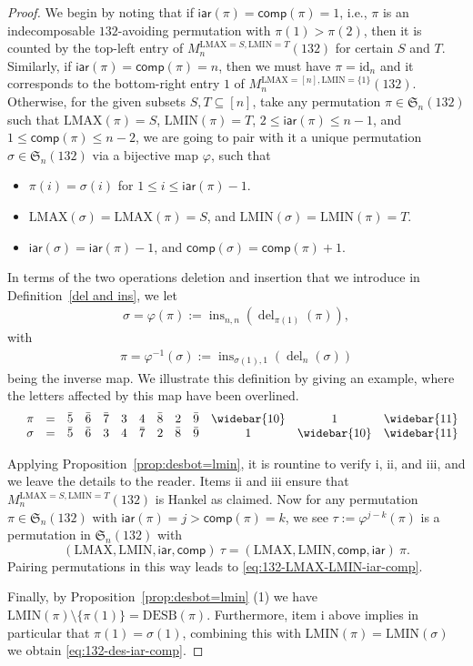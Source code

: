 \documentclass[12pt]{amsart}
\numberwithin{equation}{section}
\theoremstyle{plain}
\theoremstyle{definition}
\def\S{\mathfrak{S}}
\def\iar{\mathsf{iar}}
\def\comp{\mathsf{comp}}
\def\LMAX{\mathrm{LMAX}}
\def\LMIN{\mathrm{LMIN}}
\def\del{\operatorname{del}}
\def\ins{\operatorname{ins}}
\def\DESB{\mathrm{DESB}}
\def\id{\mathrm{id}}
\def\DESB{\mathrm{DESB}}
\begin{document}
\begin{proof}
We begin by noting that if $\iar(\pi)=\comp(\pi)=1$, i.e., $\pi$ is an indecomposable $132$-avoiding permutation with $\pi(1)>\pi(2)$, then it is counted by the top-left entry of $M_n^{\LMAX=S,\LMIN=T}(132)$ for certain $S$ and $T$. Similarly, if $\iar(\pi)=\comp(\pi)=n$, then we must have $\pi=\id_n$ and it corresponds to the bottom-right entry $1$ of $M_n^{\LMAX=[n],\LMIN=\{1\}}(132)$. Otherwise, for the given subsets $S,T\subseteq [n]$, take any permutation $\pi\in\S_n(132)$ such that $\LMAX(\pi)=S$, $\LMIN(\pi)=T$, $2\le \iar(\pi)\le n-1$, and $1\le \comp(\pi)\le n-2$, we are going to pair with it a unique permutation $\sigma\in\S_n(132)$ via a bijective map $\varphi$, such that
\begin{itemize}
	\item[i.] $\pi(i)=\sigma(i)$ for $1\le i\le \iar(\pi)-1$.
	\item[ii.] $\LMAX(\sigma)=\LMAX(\pi)=S$, and $\LMIN(\sigma)=\LMIN(\pi)=T$.
	\item[iii.] $\iar(\sigma)=\iar(\pi)-1$, and $\comp(\sigma)=\comp(\pi)+1$.
\end{itemize} 
In terms of the two operations deletion and insertion that we introduce in Definition~\ref{del and ins}, we let
\begin{align*}
\sigma=\varphi(\pi):=\ins_{n,n}(\del_{\pi(1)}(\pi)),
\end{align*}
with
\begin{align*}
\pi=\varphi^{-1}(\sigma):=\ins_{\sigma(1),1}(\del_{n}(\sigma))
\end{align*}
being the inverse map. We illustrate this definition by giving an example, where the letters affected by this map have been overlined.
\medskip
$$
\begin{array}{c c c  c c c c c c c c c c c}
	&\pi &=&\bar5&\bar6&\bar7&3&4&\bar8&2&\bar9&\widebar{10}&1&\widebar{11}\\
	&\sigma &=&\bar5&\bar6&3&4&\bar7&2&\bar8&\bar9&1&\widebar{10}&\widebar{11}
\end{array}
$$

Applying Proposition~\ref{prop:desbot=lmin}, it is rountine to verify i, ii, and iii, and we leave the details to the reader. Items ii and iii ensure that $M_n^{\LMAX=S,\LMIN=T}(132)$ is Hankel as claimed. Now for any permutation $\pi\in\S_n(132)$ with $\iar(\pi)=j>\comp(\pi)=k$, we see $\tau:=\varphi^{j-k}(\pi)$ is a permutation in $\S_n(132)$ with
$$(\LMAX,\LMIN,\iar,\comp)~\tau=(\LMAX,\LMIN,\comp,\iar)~\pi.$$
Pairing permutations in this way leads to \eqref{eq:132-LMAX-LMIN-iar-comp}.

Finally, by Proposition~\ref{prop:desbot=lmin} (1) we have $\LMIN(\pi)\setminus\{\pi(1)\}=\DESB(\pi)$. Furthermore, item i above implies in particular that $\pi(1)=\sigma(1)$, combining this with $\LMIN(\pi)=\LMIN(\sigma)$ we obtain \eqref{eq:132-des-iar-comp}.
\end{proof}
\end{document}
